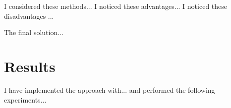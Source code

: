 \documentclass[10pt,letterpaper]{article}
\begin{document}
I considered these methods... I noticed these advantages... I noticed these disadvantages ...

The final solution...

\section{Results}

I have implemented the approach with... and performed the following experiments... 

%
%
\end{document}
